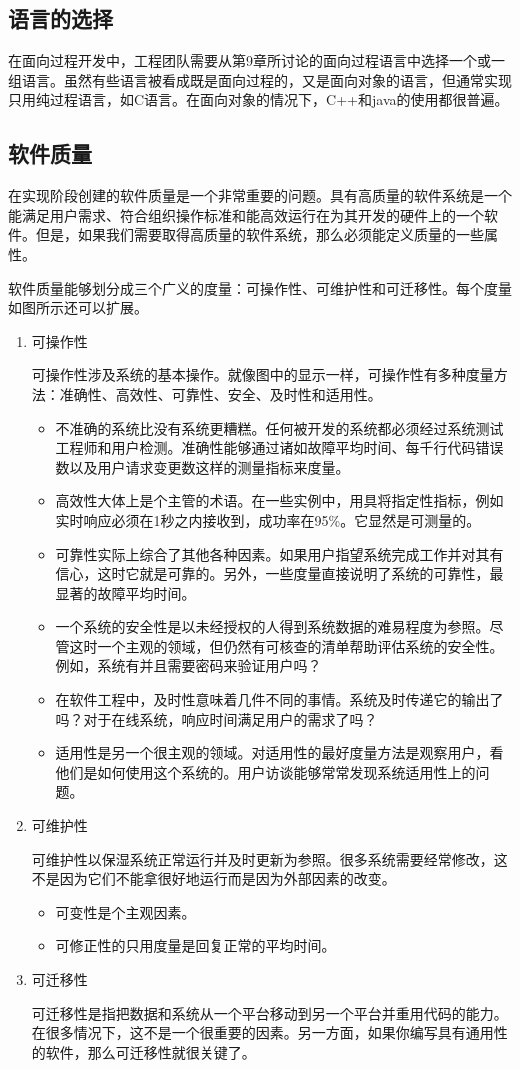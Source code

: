 \subsection{语言的选择}
在面向过程开发中，工程团队需要从第9章所讨论的面向过程语言中选择一个或一组语言。虽然有些语言被看成既是面向过程的，又是面向对象的语言，但通常实现只用纯过程语言，如C语言。在面向对象的情况下，C++和java的使用都很普遍。
\subsection{软件质量}
在实现阶段创建的软件质量是一个非常重要的问题。具有高质量的软件系统是一个能满足用户需求、符合组织操作标准和能高效运行在为其开发的硬件上的一个软件。但是，如果我们需要取得高质量的软件系统，那么必须能定义质量的一些属性。

软件质量能够划分成三个广义的度量：可操作性、可维护性和可迁移性。每个度量如图所示还可以扩展。
\begin{enumerate}
	\item 可操作性

	可操作性涉及系统的基本操作。就像图中的显示一样，可操作性有多种度量方法：准确性、高效性、可靠性、安全、及时性和适用性。
	\begin{itemize}
		\item 不准确的系统比没有系统更糟糕。任何被开发的系统都必须经过系统测试工程师和用户检测。准确性能够通过诸如故障平均时间、每千行代码错误数以及用户请求变更数这样的测量指标来度量。
		\item 高效性大体上是个主管的术语。在一些实例中，用具将指定性指标，例如实时响应必须在1秒之内接收到，成功率在95\%。它显然是可测量的。

		\item 可靠性实际上综合了其他各种因素。如果用户指望系统完成工作并对其有信心，这时它就是可靠的。另外，一些度量直接说明了系统的可靠性，最显著的故障平均时间。
		\item 一个系统的安全性是以未经授权的人得到系统数据的难易程度为参照。尽管这时一个主观的领域，但仍然有可核查的清单帮助评估系统的安全性。例如，系统有并且需要密码来验证用户吗？
		\item 在软件工程中，及时性意味着几件不同的事情。系统及时传递它的输出了吗？对于在线系统，响应时间满足用户的需求了吗？
		\item 适用性是另一个很主观的领域。对适用性的最好度量方法是观察用户，看他们是如何使用这个系统的。用户访谈能够常常发现系统适用性上的问题。
	\end{itemize}
	\item 可维护性

	可维护性以保湿系统正常运行并及时更新为参照。很多系统需要经常修改，这不是因为它们不能拿很好地运行而是因为外部因素的改变。
	\begin{itemize}
		\item 可变性是个主观因素。
		\item 可修正性的只用度量是回复正常的平均时间。
	\end{itemize}
	\item 可迁移性

	可迁移性是指把数据和系统从一个平台移动到另一个平台并重用代码的能力。在很多情况下，这不是一个很重要的因素。另一方面，如果你编写具有通用性的软件，那么可迁移性就很关键了。
\end{enumerate}
